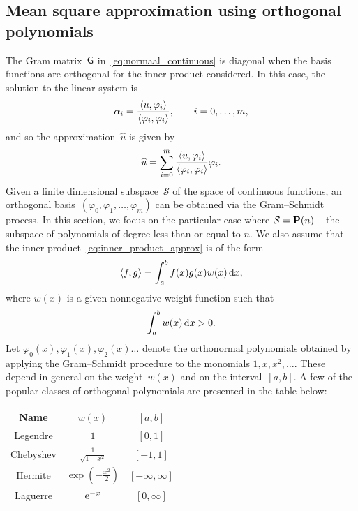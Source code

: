 \subsection{Mean square approximation using orthogonal polynomials}
The Gram matrix~$\mathsf G$ in~\eqref{eq:normaal_continuous} is diagonal when the basis functions are orthogonal for the inner product considered.
In this case, the solution to the linear system is
\[
    \alpha_i = \frac{\langle u, \varphi_i\rangle}{\langle\varphi_i, \varphi_i\rangle}, \qquad i = 0, \dotsc, m,
\]
and so the approximation~$\widehat u$ is given by
\[
    \widehat u = \sum_{i=0}^{m} \frac{\langle u, \varphi_i\rangle}{\langle\varphi_i, \varphi_i\rangle} \varphi_i.
\]
Given a finite dimensional subspace~$\mathcal S$ of the space of continuous functions,
an orthogonal basis~$(\varphi_0, \varphi_1, \dotsc, \varphi_m)$ can be obtained via the Gram--Schmidt process.
In this section, we focus on the particular case where $\mathcal S = \mathbf P(n)$
-- the subspace of polynomials of degree less than or equal to $n$.
We also assume that the inner product~\eqref{eq:inner_product_approx} is of the form
\begin{equation}
    \label{eq:ip_weighted}
    \langle f,g\rangle
    = \int_{a}^{b} f(x) g(x) w(x) \, \mathrm d x,
\end{equation}
where $w(x)$ is a given nonnegative weight function such that
\[
    \int_{a}^{b} w(x) \, \mathrm d x > 0.
\]
Let $\varphi_0(x), \varphi_1(x), \varphi_2(x) \dotsc$ denote the orthonormal polynomials obtained by applying the Gram--Schmidt procedure to the monomials $1, x, x^2, \dotsc$.
These depend in general on the weight~$w(x)$ and on the interval~$[a, b]$.
A few of the popular classes of orthogonal polynomials are presented in the table below:
\begin{center}
    \def\arraystretch{1.5}
    \begin{tabular}{|c|c|c|}
        \hline
        \textbf{Name} & $w(x)$  & $[a, b]$ \\ \hline
        Legendre & $1$  & $[0, 1]$ \\ \hline
        Chebyshev & $\frac{1}{\sqrt{1 - x^2}}$  & $[-1, 1]$ \\ \hline
        Hermite & $\exp \left( - \frac{x^2}{2} \right)$  & $[-\infty, \infty]$ \\ \hline
        Laguerre & $\mathrm e^{-x}$  & $[0, \infty]$ \\ \hline
    \end{tabular}
\end{center}


